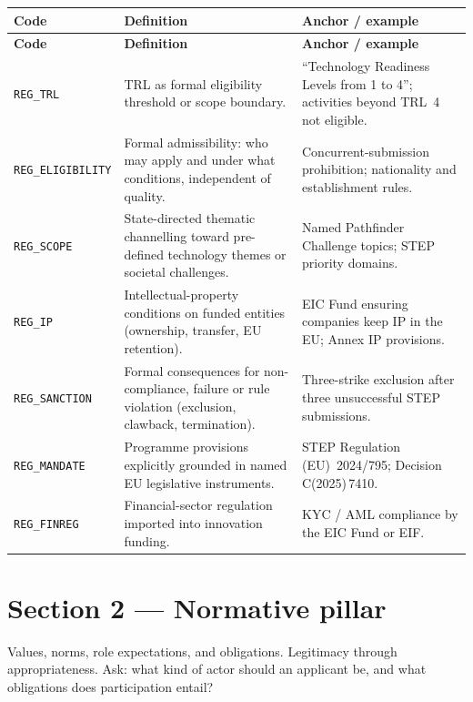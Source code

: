 \begin{longtable}{@{} l p{4.3cm} p{6.3cm} @{}}
\toprule
\textbf{Code} & \textbf{Definition} & \textbf{Anchor / example} \\
\midrule
\endfirsthead
\toprule
\textbf{Code} & \textbf{Definition} & \textbf{Anchor / example} \\
\midrule
\endhead
\bottomrule
\endfoot
\texttt{REG\_TRL} & TRL as formal eligibility threshold or scope boundary. & \enquote{Technology Readiness Levels from 1 to 4}; activities beyond TRL~4 not eligible. \\
\texttt{REG\_ELIGIBILITY} & Formal admissibility: who may apply and under what conditions, independent of quality. & Concurrent-submission prohibition; nationality and establishment rules. \\
\texttt{REG\_SCOPE} & State-directed thematic channelling toward pre-defined technology themes or societal challenges. & Named Pathfinder Challenge topics; STEP priority domains. \\
\texttt{REG\_IP} & Intellectual-property conditions on funded entities (ownership, transfer, EU retention). & EIC Fund ensuring companies keep IP in the EU; Annex IP provisions. \\
\texttt{REG\_SANCTION} & Formal consequences for non-compliance, failure or rule violation (exclusion, clawback, termination). & Three-strike exclusion after three unsuccessful STEP submissions. \\
\texttt{REG\_MANDATE} & Programme provisions explicitly grounded in named EU legislative instruments. & STEP Regulation (EU)~2024/795; Decision C(2025)\,7410. \\
\texttt{REG\_FINREG} & Financial-sector regulation imported into innovation funding. & KYC / AML compliance by the EIC Fund or EIF. \\
\end{longtable}

\section*{Section 2 --- Normative pillar}

Values, norms, role expectations, and obligations. Legitimacy through
appropriateness. Ask: what kind of actor should an applicant be, and
what obligations does participation entail?

